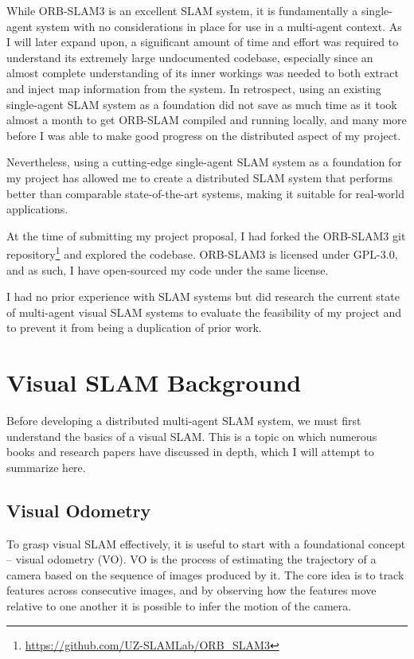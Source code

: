 While ORB-SLAM3 is an excellent SLAM system, it is fundamentally a single-agent system with no considerations in place for use in a multi-agent context. As I will later expand upon, a significant amount of time and effort was required to understand its extremely large undocumented codebase, especially since an almost complete understanding of its inner workings was needed to both extract and inject map information from the system. In retrospect, using an existing single-agent SLAM system as a foundation did not save as much time as it took almost a month to get ORB-SLAM compiled and running locally, and many more before I was able to make good progress on the distributed aspect of my project.

Nevertheless, using a cutting-edge single-agent SLAM system as a foundation for my project has allowed me to create a distributed SLAM system that performs better than comparable state-of-the-art systems, making it suitable for real-world applications.

At the time of submitting my project proposal, I had forked the ORB-SLAM3 git repository\footnote[1]{\url{https://github.com/UZ-SLAMLab/ORB_SLAM3}} and explored the codebase. ORB-SLAM3 is licensed under GPL-3.0, and as such, I have open-sourced my code under the same license.

I had no prior experience with SLAM systems but did research the current state of multi-agent visual SLAM systems to evaluate the feasibility of my project and to prevent it from being a duplication of prior work.


\section{Visual SLAM Background}
\label{sec:visual-slam-background}
Before developing a distributed multi-agent SLAM system, we must first understand the basics of a visual SLAM. This is a topic on which numerous books \autocite{gao2021introduction} \autocite{XiangGao} and research papers \autocite{durrant2006simultaneous} \autocite{taketomi2017visual} \autocite{10.1007} have discussed in depth, which I will attempt to summarize here. %

\subsection{Visual Odometry}
\label{sec:visual-slam-visual-odometry}
To grasp visual SLAM effectively, it is useful to start with a foundational concept – visual odometry (VO). VO is the process of estimating the trajectory of a camera based on the sequence of images produced by it. The core idea is to track features across consecutive images, and by observing how the features move relative to one another it is possible to infer the motion of the camera.

